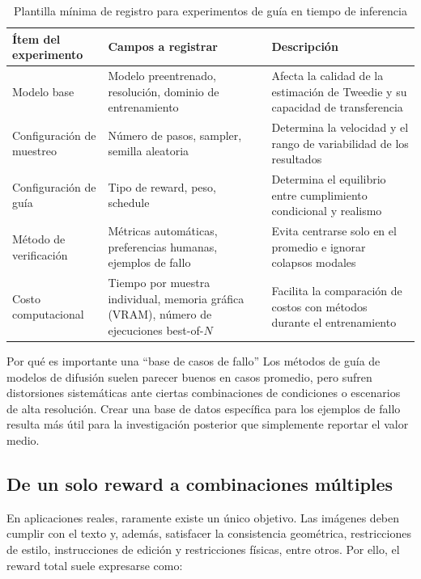 \begin{table}[H]
\centering
\begin{tabular}{p{} p{} p{}}
\toprule
Ítem del experimento & Campos a registrar & Descripción \\
\midrule
Modelo base & Modelo preentrenado, resolución, dominio de entrenamiento & Afecta la calidad de la estimación de Tweedie y su capacidad de transferencia \\
Configuración de muestreo & Número de pasos, sampler, semilla aleatoria & Determina la velocidad y el rango de variabilidad de los resultados \\
Configuración de guía & Tipo de reward, peso, schedule & Determina el equilibrio entre cumplimiento condicional y realismo \\
Método de verificación & Métricas automáticas, preferencias humanas, ejemplos de fallo & Evita centrarse solo en el promedio e ignorar colapsos modales \\
Costo computacional & Tiempo por muestra individual, memoria gráfica (VRAM), número de ejecuciones best-of-$N$ & Facilita la comparación de costos con métodos durante el entrenamiento \\
\bottomrule
\end{tabular}
\caption{Plantilla mínima de registro para experimentos de guía en tiempo de inferencia}
\end{table}

\begin{knowledgebox}{Por qué es importante una ``base de casos de fallo''}
Los métodos de guía de modelos de difusión suelen parecer buenos en casos promedio, pero sufren distorsiones sistemáticas ante ciertas combinaciones de condiciones o escenarios de alta resolución. Crear una base de datos específica para los ejemplos de fallo resulta más útil para la investigación posterior que simplemente reportar el valor medio.
\end{knowledgebox}

\subsection{De un solo reward a combinaciones múltiples}

En aplicaciones reales, raramente existe un único objetivo. Las imágenes deben cumplir con el texto y, además, satisfacer la consistencia geométrica, restricciones de estilo, instrucciones de edición y restricciones físicas, entre otros. Por ello, el reward total suele expresarse como:

